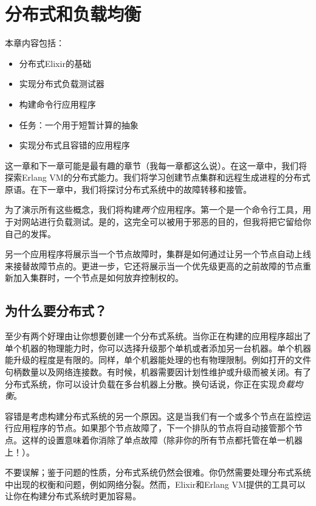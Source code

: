 \chapter{分布式和负载均衡}\label{chapt:load-balance}

本章内容包括：

\begin{itemize}

\item  分布式Elixir的基础
\item  实现分布式负载测试器
\item  构建命令行应用程序
\item  任务：一个用于短暂计算的抽象
\item  实现分布式且容错的应用程序
\end{itemize}

这一章和下一章可能是最有趣的章节（我每一章都这么说）。在这一章中，我们将探索Erlang
VM的分布式能力。我们将学习创建节点集群和远程生成进程的分布式原语。在下一章中，我们将探讨分布式系统中的故障转移和接管。

为了演示所有这些概念，我们将构建\emph{两个}应用程序。第一个是一个命令行工具，用于对网站进行负载测试。是的，这完全可以被用于邪恶的目的，但我将把它留给你自己的发挥。

另一个应用程序将展示当一个节点故障时，集群是如何通过让另一个节点自动上线来接替故障节点的。更进一步，它还将展示当一个优先级更高的之前故障的节点重新加入集群时，一个节点是如何放弃控制权的。

\section{为什么要分布式？}

至少有两个好理由让你想要创建一个分布式系统。当你正在构建的应用程序超出了单个机器的物理能力时，你可以选择升级那个单机或者添加另一台机器。单个机器能升级的程度是有限的。同样，单个机器能处理的也有物理限制。例如打开的文件句柄数量以及网络连接数。有时候，机器需要因计划性维护或升级而被关闭。有了分布式系统，你可以设计负载在多台机器上分散。换句话说，你正在实现\emph{负载均衡}。

容错是考虑构建分布式系统的另一个原因。这是当我们有一个或多个节点在监控运行应用程序的节点。如果那个节点故障了，下一个排队的节点将自动接管那个节点。这样的设置意味着你消除了单点故障（除非你的所有节点都托管在单一机器上！）。

不要误解；鉴于问题的性质，分布式系统仍然会很难。你仍然需要处理分布式系统中出现的权衡和问题，例如网络分裂。然而，Elixir和Erlang
VM提供的工具可以让你在构建分布式系统时更加容易。

